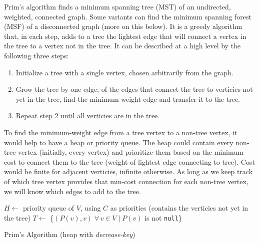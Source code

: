 \documentclass[12pt, titlepage]{article}
\begin{document}
Prim's algorithm finds a minimum spanning tree (MST) of an undirected, weighted, connected graph. Some variants can find the minimum spanning forest (MSF) of a disconnected graph (more on this below). It is a greedy algorithm that, in each step, adds to a tree the lightest edge that will connect a vertex in the tree to a vertex not in the tree. It can be described at a high level by the following three steps:

\begin{enumerate}
  \item Initialize a tree with a single vertex, chosen arbitrarily from the graph.
  \item Grow the tree by one edge; of the edges that connect the tree to verticies not yet in the tree, find the minimum-weight edge and transfer it to the tree.
  \item Repeat step 2 until all verticies are in the tree.
\end{enumerate}

To find the minimum-weight edge from a tree vertex to a non-tree vertex, it would help to have a heap or priority queue. The heap could contain every non-tree vertex (initially, every vertex) and prioritize them based on the minimum cost to connect them to the tree (weight of lightest edge connecting to tree). Cost would be finite for adjacent verticies, infinite otherwise. As long as we keep track of which tree vertex provides that min-cost connection for each non-tree vertex, we will know which edges to add to the tree. \\

\begin{algorithm}[H]
  \SetAlgoLined
  \DontPrintSemicolon
  $H \longleftarrow$\hspace{0.5mm} priority queue of $V$, using $C$ as priorities\;
  \hspace{13mm}(contains the verticies not yet in the tree)\;
  $T \longleftarrow$\hspace{0.5mm} \{$(P(v), v)\;\forall\,v\in V\mid P(v)$ is not \texttt{null}\}\;
  \;
  \caption{Prim's Algorithm (heap with \textit{decrease-key})}
\end{algorithm} \medskip
\end{document}
